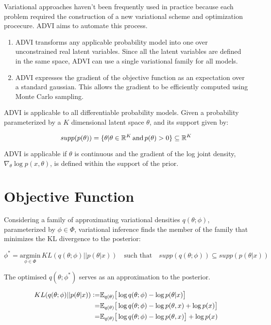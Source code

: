 \documentclass[10pt]{article}
\newcommand{\defeq}{\vcentcolon=}
\begin{document}
Variational approaches haven't been frequently used in practice because each problem required the construction of a new
variational scheme and optimization procecure. ADVI aims to automate this process. 

\begin{enumerate}
  \item ADVI transforms any applicable probability model into one over unconstrained real latent variables. Since all the 
  latent variables are defined in the same space, ADVI can use a single variational family for all models. 
  \item ADVI expresses the gradient of the objective function as an expectation over a standard gaussian. This allows
  the gradient to be efficiently computed using Monte Carlo sampling. 
\end{enumerate}

ADVI is applicable to all differentiable probability models. Given a probability parameterized by a $K$ dimensional 
latent space $\theta$, and its support given by:

\begin{equation}
  supp(p(\theta)) = \{\theta | \theta \in \mathbb{R}^K \, \text{and} \, p(\theta) > 0 \} \subseteq \mathbb{R} ^ K \notag
\end{equation}

ADVI is applicable if $\theta$ is continuous and the gradient of the log joint density, $\nabla_{\theta}\log p(x, \theta)$, 
is defined within the support of the prior.

\section*{Objective Function}

Considering a family of approximating variational densities $q(\theta ; \phi)$, parameterized by $\phi \in \Phi$, 
variational inference finds the member of the family that minimizes the KL divergence to the posterior:

\begin{equation*}
  \phi^* = \underset{\phi \in \Phi}{\text{argmin}}\, KL(q(\theta ; \phi) || p(\theta | x)) \quad \text{such that} \quad supp(q(\theta ; \phi)) \subseteq supp(p(\theta | x))
\end{equation*}

The optimised $q(\theta; \phi^*)$ serves as an approximation to the posterior. 

\begin{align*}
  KL(q(\theta ; \phi) || p(\theta | x)) \defeq &\mathbb{E}_{q(\theta)}\big[\log q(\theta;\phi) - \log p(\theta|x)  \big] \\
  =& \mathbb{E}_{q(\theta)}\big[\log q(\theta;\phi) - \log p(\theta, x) + \log p(x)\big] \\
  =& \mathbb{E}_{q(\theta)}\big[\log q(\theta;\phi) - \log p(\theta, x) \big] + \log p(x)
\end{align*}
\end{document}

